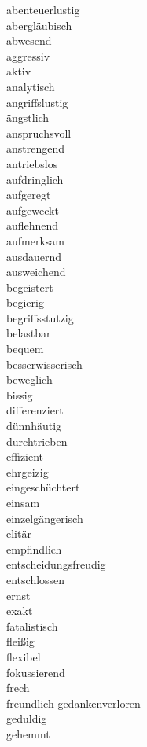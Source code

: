 \documentclass[10pt,a4paper]{article}
\begin{document}
abenteuerlustig \\
abergläubisch \\
abwesend \\
aggressiv \\
aktiv \\
analytisch \\
angriffslustig \\
ängstlich \\
anspruchsvoll \\
anstrengend \\
antriebslos \\
aufdringlich \\
aufgeregt \\
aufgeweckt \\
auflehnend \\
aufmerksam \\
ausdauernd \\
ausweichend \\
begeistert \\
begierig \\
begriffsstutzig \\
belastbar \\
bequem \\
besserwisserisch \\
beweglich \\
bissig \\
differenziert \\
dünnhäutig \\
durchtrieben \\
effizient \\
ehrgeizig \\
eingeschüchtert \\
einsam \\
einzelgängerisch \\
elitär \\
empfindlich \\
entscheidungsfreudig \\
entschlossen \\
ernst \\
exakt \\
fatalistisch \\
fleißig \\
flexibel \\
fokussierend \\
frech \\
freundlich
gedankenverloren \\
geduldig \\
gehemmt \\
\end{document}

